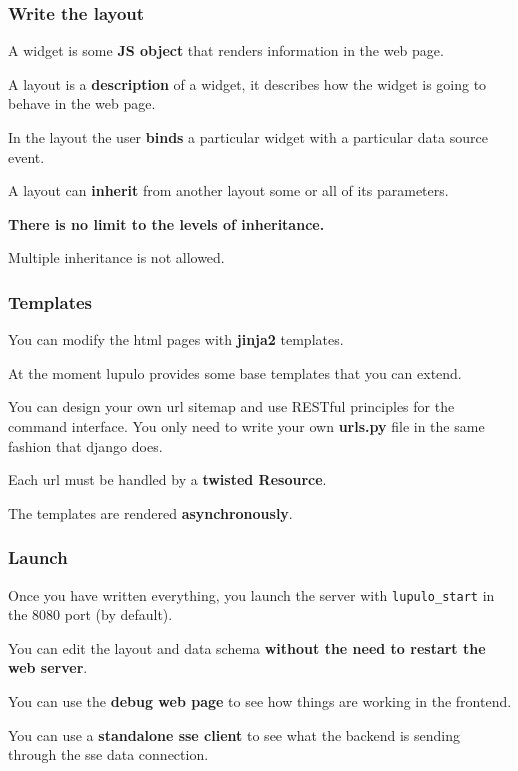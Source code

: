 \documentclass{beamer}
\begin{document}
    \begin{frame}
        \frametitle{Write the layout}
        A widget is some \textbf{JS object} that renders information in the web
        page.

        A layout is a \textbf{description} of a widget, it describes how the
        widget is going to behave in the web page.

        In  the layout the user \textbf{binds} a particular widget with a
        particular data source event.

        A layout can \textbf{inherit} from another layout some or all of its
        parameters.

        \textbf{There is no limit to the levels of inheritance.}

        Multiple inheritance is not allowed.
    \end{frame}

    \begin{frame}
        \frametitle{Templates}
        You can modify the html pages with \textbf{jinja2} templates.

        At the moment lupulo provides some base templates that you can extend.

        You can design your own url sitemap and use RESTful principles for the
        command interface. You only need to write your own \textbf{urls.py} file
        in the same fashion that django does.

        Each url must be handled by a \textbf{twisted Resource}.

        The templates are rendered \textbf{asynchronously}.
    \end{frame}

    \begin{frame}
        \frametitle{Launch}
        Once you have written everything, you launch the server with
        \texttt{lupulo\_start} in the 8080 port (by default).

        You can edit the layout and data schema \textbf{without the need to
        restart the web server}.

        You can use the \textbf{debug web page} to see how things are working in
        the frontend.

        You can use a \textbf{standalone sse client} to see what the backend is
        sending through the sse data connection.
    \end{frame}
\end{document}
